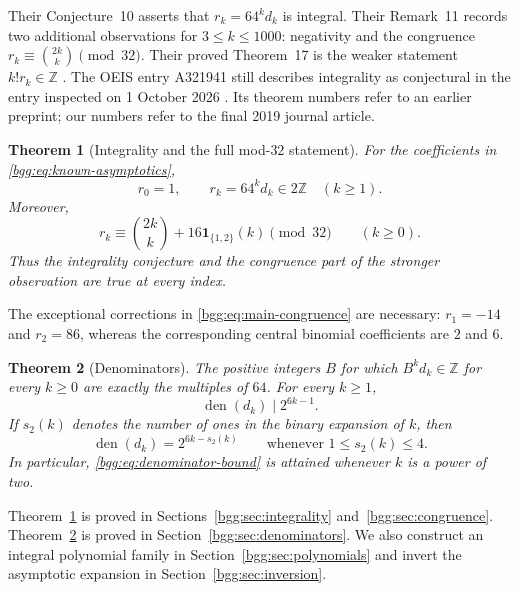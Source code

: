 \documentclass[11pt,a4paper]{article}
\numberwithin{equation}{section}
\newtheorem{theorem}{Theorem}[section]
\theoremstyle{definition}
\theoremstyle{remark}
\theoremstyle{definition}
\newcommand{\Z}{\mathbb Z}
\newcommand{\den}{\operatorname{den}}
\newcommand{\ind}{\mathbf 1}
\begin{document}
Their Conjecture~10 asserts that $r_k=64^kd_k$ is integral. Their Remark~11
records two additional observations for $3\le k\le1000$: negativity and the
congruence $r_k\equiv\binom{2k}{k}\pmod{32}$. Their proved Theorem~17 is the
weaker statement $k!r_k\in\Z$ \cite{BGG}. The OEIS entry A321941 still describes
integrality as conjectural in the entry inspected on 1 October 2026
\cite{oeis321941}. Its theorem numbers refer to an earlier preprint; our
numbers refer to the final 2019 journal article.

\begin{theorem}[Integrality and the full mod-$32$ statement]\label{bgg:thm:main}
For the coefficients in \eqref{bgg:eq:known-asymptotics},
\begin{equation}\label{bgg:eq:main-even}
 r_0=1,\qquad r_k=64^kd_k\in2\Z\quad(k\ge1).
\end{equation}
Moreover,
\begin{equation}\label{bgg:eq:main-congruence}
 r_k\equiv\binom{2k}{k}+16\ind_{\{1,2\}}(k)\pmod{32}
 \qquad(k\ge0).
\end{equation}
Thus the integrality conjecture and the congruence part of the stronger
observation are true at every index.
\end{theorem}

The exceptional corrections in \eqref{bgg:eq:main-congruence} are necessary:
$r_1=-14$ and $r_2=86$, whereas the corresponding central binomial
coefficients are $2$ and $6$.

\begin{theorem}[Denominators]\label{bgg:thm:denominators-summary}
The positive integers $B$ for which $B^kd_k\in\Z$ for every $k\ge0$ are
exactly the multiples of $64$. For every $k\ge1$,
\begin{equation}\label{bgg:eq:denominator-bound}
 \den(d_k)\mid 2^{6k-1}.
\end{equation}
If $s_2(k)$ denotes the number of ones in the binary expansion of $k$, then
\begin{equation}\label{bgg:eq:exact-denominator}
 \den(d_k)=2^{6k-s_2(k)}\qquad\text{whenever }1\le s_2(k)\le4.
\end{equation}
In particular, \eqref{bgg:eq:denominator-bound} is attained whenever $k$ is a
power of two.
\end{theorem}

Theorem~\ref{bgg:thm:main} is proved in Sections~\ref{bgg:sec:integrality}
and~\ref{bgg:sec:congruence}. Theorem~\ref{bgg:thm:denominators-summary} is proved in
Section~\ref{bgg:sec:denominators}. We also construct an integral polynomial family
in Section~\ref{bgg:sec:polynomials} and invert the asymptotic expansion in
Section~\ref{bgg:sec:inversion}.
\end{document}
